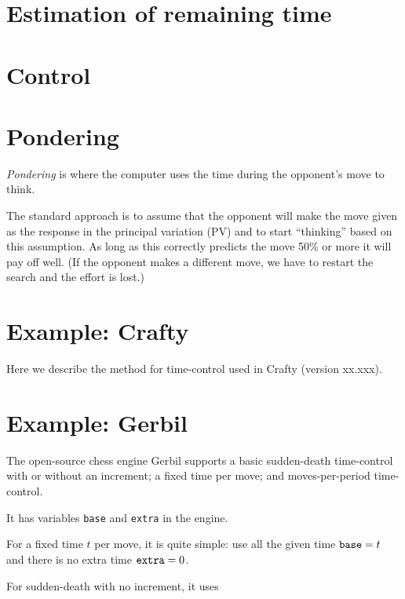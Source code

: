 \documentclass[10pt,dvipdfmx]{report}
\begin{document}
\section{Estimation of remaining time}
\section{Control}
\section{Pondering}
{\em Pondering} is where the computer uses the time during the opponent's move to
think.

The standard approach is to assume that the opponent will make the move given as the
response in the principal variation (PV) and to start ``thinking'' based on this assumption.
As long as this correctly predicts the move 50\% or more it will pay off well.  (If the
opponent makes a different move, we have to restart the search and the effort is lost.)

\section{Example: Crafty}

Here we describe the method for time-control used in Crafty (version xx.xxx).

\section{Example: Gerbil}

The open-source chess engine Gerbil supports a basic sudden-death time-control
with or without an increment; a fixed time per move;
and moves-per-period time-control.

It has variables \verb|base| and \verb|extra| in the engine.

For a fixed time $t$ per move, it is quite simple: use all the given
time $\verb|base|=t$ and there is no extra time $\verb|extra|=0$.

For sudden-death with no increment, it uses 
\end{document}
